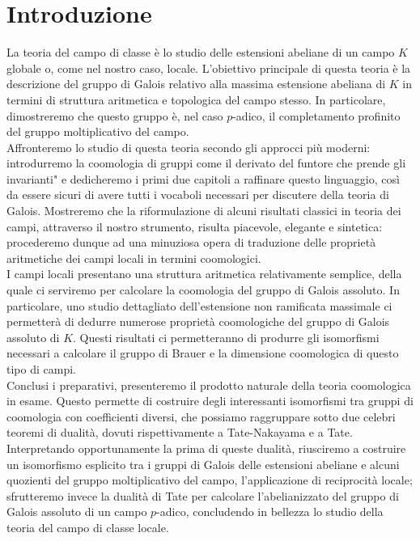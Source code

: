 \chapter*{Introduzione}

La teoria del campo di classe è lo studio delle estensioni abeliane di un campo $ K $ globale o, come nel nostro caso, locale. L'obiettivo principale di questa teoria è la descrizione del gruppo di Galois relativo alla massima estensione abeliana di $K$ in termini di struttura aritmetica e topologica del campo stesso. In particolare, dimostreremo che questo gruppo è, nel caso $p$-adico, il completamento profinito del gruppo moltiplicativo del campo. \\

Affronteremo lo studio di questa teoria secondo gli approcci più moderni: introdurremo la coomologia di gruppi come il derivato del funtore che \leftquote prende gli invarianti" e dedicheremo i primi due capitoli a raffinare questo linguaggio, così da essere sicuri di avere tutti i vocaboli necessari per discutere della teoria di Galois. Mostreremo che la riformulazione di alcuni risultati classici in teoria dei campi, attraverso il nostro strumento, risulta piacevole, elegante e sintetica: procederemo dunque ad una minuziosa opera di traduzione delle proprietà aritmetiche dei campi locali in termini coomologici. \\

I campi locali presentano una struttura aritmetica relativamente semplice, della quale ci serviremo per calcolare la coomologia del gruppo di Galois assoluto. In particolare, uno studio dettagliato dell'estensione non ramificata massimale ci permetterà di dedurre numerose proprietà coomologiche del gruppo di Galois assoluto di $K$. Questi risultati ci permetteranno di produrre gli isomorfismi necessari a calcolare il gruppo di Brauer e la dimensione coomologica di questo tipo di campi. \\

Conclusi i preparativi, presenteremo il prodotto naturale della teoria coomologica in esame. Questo permette di costruire degli interessanti isomorfismi tra gruppi di coomologia con coefficienti diversi, che possiamo raggruppare sotto due celebri teoremi di dualità, dovuti rispettivamente a Tate-Nakayama e a Tate. Interpretando opportunamente la prima di queste dualità, riusciremo a costruire un isomorfismo esplicito tra i gruppi di Galois delle estensioni abeliane e alcuni quozienti del gruppo  moltiplicativo del campo, l'applicazione di reciprocità locale; sfrutteremo invece la dualità di Tate per calcolare l'abelianizzato del gruppo di Galois assoluto di un campo $ p $-adico, concludendo in bellezza lo studio della teoria del campo di classe locale. \\

